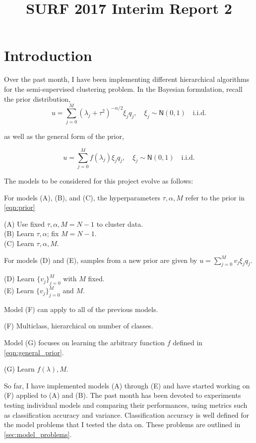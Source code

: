 \documentclass{siamart1116}
\title{SURF 2017 Interim Report 2}
\author{\TheAuthors}
\date{}
\begin{document}
\maketitle
\setlength{\unitlength}{1in}
\setlength{\parindent}{0in}

\section{Introduction}
    Over the past month, I have been implementing different hierarchical algorithms for the semi-supervised clustering problem. In the Bayesian formulation, recall the prior distribution,
    \begin{equation}
    \label{eqn:prior}
    u = \sum_{j=0}^M (\lambda_j + \tau^2)^{-\alpha/2}\xi_j q_j,\quad \xi_j\sim \mathsf{N}(0,1) \quad \text{i.i.d.}
    \end{equation}

    as well as the general form of the prior,

    \begin{equation}
    \label{eqn:general_prior}
    u = \sum_{j=0}^M f(\lambda_j)\xi_j q_j,\quad \xi_j\sim \mathsf{N}(0,1) \quad \text{i.i.d.}
    \end{equation}

    The models to be considered for this project evolve as follows:

    For models (A), (B), and (C), the hyperparameters $\tau,\alpha,M$ refer to the prior in \cref{eqn:prior}

    (A) Use fixed $\tau,\alpha, M=N-1$ to cluster data.\\
    (B) Learn $\tau,\alpha$; fix $M=N-1$.\\
    (C) Learn $\tau,\alpha,M$.

    For models (D) and (E), samples from a new prior are given by $u = \sum_{j=0}^M v_j\xi_j q_j$.

    (D) Learn $\{v_j\}_{j=0}^M$ with $M$ fixed.\\
    (E) Learn $\{v_j\}_{j=0}^M$ and $M$.

    Model (F) can apply to all of the previous models.

    (F) Multiclass, hierarchical on number of classes.

    Model (G) focuses on learning the arbitrary function $f$ defined in \cref{eqn:general_prior}. 

    (G) Learn $f(\lambda), M$.

    So far, I have implemented models (A) through (E) and have started working on (F) applied to (A) and (B). The past month has been devoted to experiments testing individual models and comparing their performances, using metrics such as classification accuracy and variance. Classification accuracy is well defined for the model problems that I tested the data on. These problems are outlined in \cref{sec:model_problems}.
\end{document}
